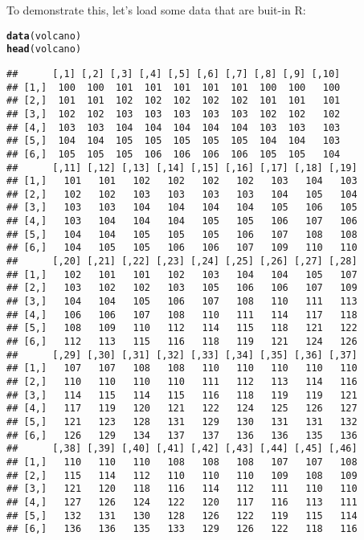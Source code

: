 \documentclass[12pt,a4paper]{scrartcl}\usepackage[]{graphicx}\usepackage[]{color}
\makeatletter
\newcommand{\hlstd}[1]{\textcolor[rgb]{0.345,0.345,0.345}{#1}}%
\newcommand{\hlkwd}[1]{\textcolor[rgb]{0.737,0.353,0.396}{\textbf{#1}}}%
\newenvironment{kframe}{%
 \def\at@end@of@kframe{}%
 \ifinner\ifhmode%
  \def\at@end@of@kframe{\end{minipage}}%
  \begin{minipage}{\columnwidth}%
 \fi\fi%
 \def\FrameCommand##1{\hskip\@totalleftmargin \hskip-\fboxsep
 \colorbox{shadecolor}{##1}\hskip-\fboxsep
     \hskip-\linewidth \hskip-\@totalleftmargin \hskip\columnwidth}%
 \MakeFramed {\advance\hsize-\width
   \@totalleftmargin\z@ \linewidth\hsize
   \@setminipage}}%
 {\par\unskip\endMakeFramed%
 \at@end@of@kframe}
\newenvironment{knitrout}{}{} %
\makeatother
\begin{document}
To demonstrate this, let's load some data that are buit-in R:
\begin{knitrout}
\color{fgcolor}\begin{kframe}
\begin{alltt}
\hlkwd{data}\hlstd{(volcano)}
\hlkwd{head}\hlstd{(volcano)}
\end{alltt}
\begin{verbatim}
##      [,1] [,2] [,3] [,4] [,5] [,6] [,7] [,8] [,9] [,10]
## [1,]  100  100  101  101  101  101  101  100  100   100
## [2,]  101  101  102  102  102  102  102  101  101   101
## [3,]  102  102  103  103  103  103  103  102  102   102
## [4,]  103  103  104  104  104  104  104  103  103   103
## [5,]  104  104  105  105  105  105  105  104  104   103
## [6,]  105  105  105  106  106  106  106  105  105   104
##      [,11] [,12] [,13] [,14] [,15] [,16] [,17] [,18] [,19]
## [1,]   101   101   102   102   102   102   103   104   103
## [2,]   102   102   103   103   103   103   104   105   104
## [3,]   103   103   104   104   104   104   105   106   105
## [4,]   103   104   104   104   105   105   106   107   106
## [5,]   104   104   105   105   105   106   107   108   108
## [6,]   104   105   105   106   106   107   109   110   110
##      [,20] [,21] [,22] [,23] [,24] [,25] [,26] [,27] [,28]
## [1,]   102   101   101   102   103   104   104   105   107
## [2,]   103   102   102   103   105   106   106   107   109
## [3,]   104   104   105   106   107   108   110   111   113
## [4,]   106   106   107   108   110   111   114   117   118
## [5,]   108   109   110   112   114   115   118   121   122
## [6,]   112   113   115   116   118   119   121   124   126
##      [,29] [,30] [,31] [,32] [,33] [,34] [,35] [,36] [,37]
## [1,]   107   107   108   108   110   110   110   110   110
## [2,]   110   110   110   110   111   112   113   114   116
## [3,]   114   115   114   115   116   118   119   119   121
## [4,]   117   119   120   121   122   124   125   126   127
## [5,]   121   123   128   131   129   130   131   131   132
## [6,]   126   129   134   137   137   136   136   135   136
##      [,38] [,39] [,40] [,41] [,42] [,43] [,44] [,45] [,46]
## [1,]   110   110   110   108   108   108   107   107   108
## [2,]   115   114   112   110   110   110   109   108   109
## [3,]   121   120   118   116   114   112   111   110   110
## [4,]   127   126   124   122   120   117   116   113   111
## [5,]   132   131   130   128   126   122   119   115   114
## [6,]   136   136   135   133   129   126   122   118   116

\end{verbatim}
\end{kframe}
\end{knitrout}
\end{document}
